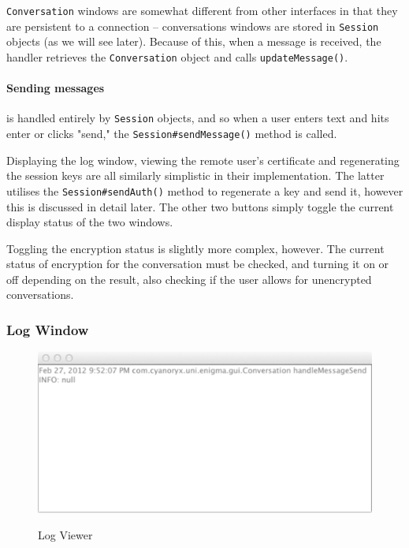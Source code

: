     \verb!Conversation! windows are somewhat different from other interfaces in that they are persistent to a connection -- conversations windows are stored in \verb!Session! objects (as we will see later). Because of this, when a message is received, the handler retrieves the \verb!Conversation! object and calls \verb!updateMessage()!.
    
    \paragraph{Sending messages} is handled entirely by \verb!Session! objects, and so when a user enters text and hits enter or clicks "send," the \verb!Session#sendMessage()! method is called.
    
    Displaying the log window, viewing the remote user's certificate and regenerating the session keys are all similarly simplistic in their implementation. The latter utilises the \verb!Session#sendAuth()! method to regenerate a key and send it, however this is discussed in detail later. The other two buttons simply toggle the current display status of the two windows.
    
    Toggling the encryption status is slightly more complex, however. The current status of encryption for the conversation must be checked, and turning it on or off depending on the result, also checking if the user allows for unencrypted conversations.
    
    \subsubsection{Log Window}
    
    \begin{figure}
      \centering
      \includegraphics[scale=0.5]{./Figures/Ch6/6-3-1-2-log_window.pdf}
      \label{fig:log_window}
      \caption{Log Viewer}
     \end{figure}
    
